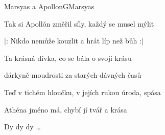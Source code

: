 \begin{song}{Marsyas a Apollon}{G}{Marsyas}
\begin{SBChorus}

Tak si Apollón změřil síly, každý se musel mýlit

$|$: Nikdo nemůže kouzlit a hrát líp než bůh :$|$

\end{SBChorus}

\begin{SBVerse}

Ta krásná dívka, co se bála o svoji krásu

dárkyně moudrosti za starých dávných časů

Teď v tichém hloučku, v jejích rukou úroda, spása

Athéna jméno má, chybí jí tvář a krása

\end{SBVerse}

\begin{SBChorus}

Dy dy dy \dots

\end{SBChorus}

\end{song}

\pagebreak
